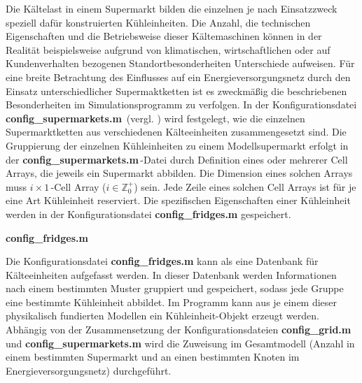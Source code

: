 Die Kältelast in einem Supermarkt bilden die einzelnen je nach Einsatzzweck
speziell dafür konstruierten Kühleinheiten. Die Anzahl, die technischen
Eigenschaften und die Betriebsweise dieser Kältemaschinen können in der Realität
beispielsweise aufgrund von klimatischen, wirtschaftlichen oder auf
Kundenverhalten bezogenen Standortbesonderheiten Unterschiede
aufweisen. Für eine breite Betrachtung des
Einflusses auf ein Energieversorgungsnetz durch den Einsatz unterschiedlicher
Supermaktketten ist es zweckmäßig die beschriebenen Besonderheiten im
Simulationsprogramm zu verfolgen. In der Konfigurationsdatei
\textbf{config\_supermarkets.m$\,$} (vergl. ) wird festgelegt,
wie die einzelnen Supermarktketten aus verschiedenen Kälteeinheiten
zusammengesetzt sind. Die Gruppierung der einzelnen Kühleinheiten zu einem
Modellsupermarkt erfolgt in der \textbf{config\_supermarkets.m$\,$}-Datei durch
Definition eines oder mehrerer Cell Arrays, die jeweils ein Supermarkt abbilden.
Die Dimension eines solchen Arrays muss $i\times1\,$-Cell Array ($i\in
\mathbb{Z}^+_0$) sein. Jede Zeile eines solchen Cell Arrays ist für je eine
Art Kühleinheit reserviert. Die spezifischen Eigenschaften einer Kühleinheit
werden in der Konfigurationsdatei \textbf{config\_fridges.m} gespeichert.

\vspace{3mm}%
\noindent\textbf{config\_fridges.m}
\vspace{3mm}

Die Konfigurationsdatei \textbf{config\_fridges.m} kann als eine Datenbank für
Kälteeinheiten aufgefasst werden. In dieser Datenbank werden Informationen nach
einem bestimmten Muster gruppiert und gespeichert, sodass jede Gruppe eine
bestimmte Kühleinheit abbildet. Im Programm kann aus
je einem dieser physikalisch fundierten Modellen ein Kühleinheit-Objekt
erzeugt werden. Abhängig von der Zusammensetzung der Konfigurationsdateien
\textbf{config\_grid.m} und \textbf{config\_supermarkets.m} wird die Zuweisung
im Gesamtmodell (Anzahl in einem bestimmten Supermarkt und an einen bestimmten
Knoten im Energieversorgungsnetz) durchgeführt.

